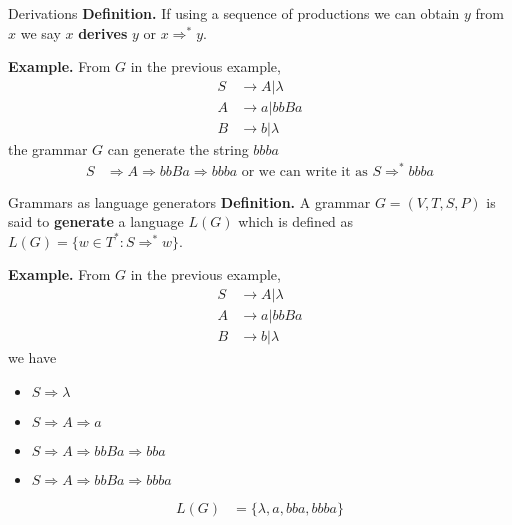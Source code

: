 \documentclass[10pt]{beamer}
\begin{document}
\begin{frame}{Derivations}
    \textbf{Definition.} If using a sequence of productions we can obtain $y$ from $x$ we say $x$ \textbf{derives} $y$ or $x \Rightarrow^* y$.

    \textbf{Example.} From $G$ in the previous example,
    \begin{align*}
        S & \rightarrow A|\lambda \\
        A & \rightarrow a|bbBa    \\
        B & \rightarrow b|\lambda
    \end{align*}
    the grammar $G$ can generate the string $bbba$
    \begin{align*}
        S & \Rightarrow A \Rightarrow bbBa \Rightarrow bbba  \text{ or we can write it as }
        S \Rightarrow^* bbba
    \end{align*}
\end{frame}

\begin{frame}{Grammars as language generators}
    \textbf{Definition.} A grammar $G=(V,T,S,P)$ is said to \textbf{generate} a language $L(G)$ which is defined as $L(G) = \{w \in T^* : S \Rightarrow^* w\}$.

    \textbf{Example.} From $G$ in the previous example,
    \begin{align*}
        S & \rightarrow A|\lambda \\
        A & \rightarrow a|bbBa    \\
        B & \rightarrow b|\lambda
    \end{align*}
    we have
    \begin{itemize}
        \item $S \Rightarrow \lambda$
        \item $S \Rightarrow A \Rightarrow a$
        \item $S \Rightarrow A \Rightarrow bbBa \Rightarrow bba$
        \item $S \Rightarrow A \Rightarrow bbBa \Rightarrow bbba$
    \end{itemize}
    \begin{align*}
        L(G) & = \{\lambda, a, bba, bbba\}
    \end{align*}
\end{frame}
\end{document}
